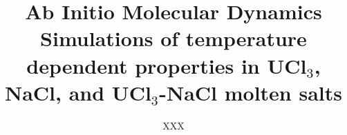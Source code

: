 \documentclass[preprint,3p,10pt,twocolumn,number,sort&compress]{elsarticle}
\begin{document}
\begin{frontmatter}



\title{Ab Initio Molecular Dynamics Simulations of temperature dependent properties in UCl$_3$, NaCl, and UCl$_3$-NaCl molten salts}


\author{XXX}


\end{frontmatter}
\end{document}
